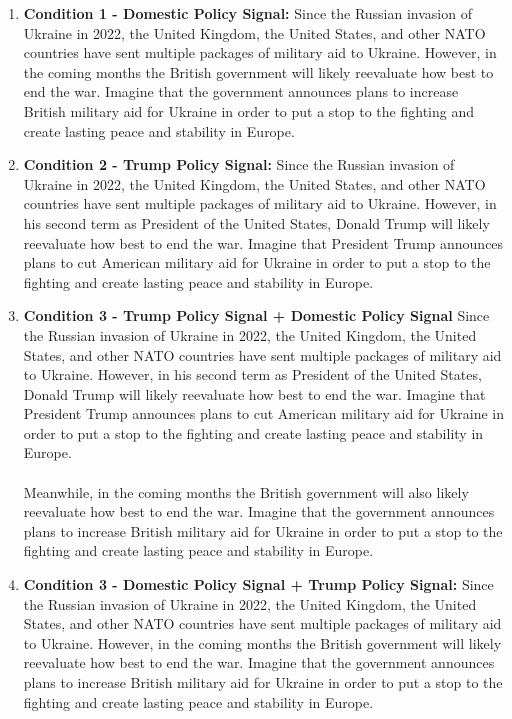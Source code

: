 \begin{appendices}
\begin{enumerate}
\begin{enumerate}
        \item \textbf{Condition 1 - Domestic Policy Signal:} Since the Russian invasion of Ukraine in 2022, the United Kingdom, the United States, and other NATO countries have sent multiple packages of military aid to Ukraine. However, in the coming months the British government will likely reevaluate how best to end the war. Imagine that the government announces plans to increase British military aid for Ukraine in order to put a stop to the fighting and create lasting peace and stability in Europe.  
        \item \textbf{Condition 2 - Trump Policy Signal:} Since the Russian invasion of Ukraine in 2022, the United Kingdom, the United States, and other NATO countries have sent multiple packages of military aid to Ukraine. However, in his second term as President of the United States, Donald Trump will likely reevaluate how best to end the war. Imagine that President Trump announces plans to cut American military aid for Ukraine in order to put a stop to the fighting and create lasting peace and stability in Europe.
        \item \textbf{Condition 3 - Trump Policy Signal + Domestic Policy Signal} Since the Russian invasion of Ukraine in 2022, the United Kingdom, the United States, and other NATO countries have sent multiple packages of military aid to Ukraine. However, in his second term as President of the United States, Donald Trump will likely reevaluate how best to end the war. Imagine that President Trump announces plans to cut American military aid for Ukraine in order to put a stop to the fighting and create lasting peace and stability in Europe. 
        \paragraph{}
        Meanwhile, in the coming months the British government will also likely reevaluate how best to end the war. Imagine that the government announces plans to increase British military aid for Ukraine in order to put a stop to the fighting and create lasting peace and stability in Europe.
        \item \textbf{Condition 3 - Domestic Policy Signal + Trump Policy Signal:} Since the Russian invasion of Ukraine in 2022, the United Kingdom, the United States, and other NATO countries have sent multiple packages of military aid to Ukraine. However, in the coming months the British government will likely reevaluate how best to end the war. Imagine that the government announces plans to increase British military aid for Ukraine in order to put a stop to the fighting and create lasting peace and stability in Europe. 

\end{enumerate}
\end{enumerate}
\end{appendices}

